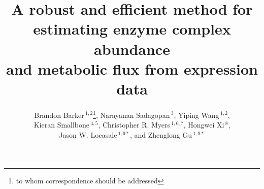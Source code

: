 \documentclass{bioinfo}
\newcommand*{\commonDir}{../common/}   %
\begin{document}

\renewcommand{\figurename}{\textbf{Fig.}}
\captionsetup{belowskip=0pt}









\title[FALCON]{A robust and efficient method for\\ 
estimating enzyme complex abundance\\ 
and metabolic flux from expression data}
  \author[Barker \textit{et~al.}]{Brandon Barker\,$^{1,2}$\footnote{to whom correspondence should be addressed},
    Narayanan Sadagopan\,$^{3}$, Yiping Wang\,$^{1,2}$, \\
    Kieran Smallbone\,$^{4,5}$, Christopher R. Myers\,$^{1,6,7}$, Hongwei Xi\,$^{8}$, \\ 
    Jason W. Locasale\,$^{1,9*}$, and Zhenglong Gu\,$^{1,9*}$\\
 }

\address{$^{1}$Tri-Institutional Training Program in Computational
  Biology and Medicine, 1300 York Avenue, Box 194, New York, NY, USA.
  $^{2}$Department of Biological Statistics and Computational Biology, 
    Cornell University, 1198 Comstock Hall, Ithaca, NY, USA.
  $^{3}$College of Engineering, Cornell University, Carpenter Hall, 
    Ithaca, NY, USA.
  $^{4}$ School of Computer Science, The University of Manchester, Manchester, UK.
  $^{5}$Manchester Center for Integrative Systems Biology, The University of Manchester, Manchester, UK.
  $^{6}$Laboratory of Atomic and Solid State Physics, Cornell University, Ithaca, NY, USA.
  $^{7}$Institute of Biotechnology, Cornell University, Ithaca, NY, USA.
  $^{8}$Department of Computer Science, Boston University,
    111 Cummington Street, Boston, MA, USA.
  $^{9}$Division of Nutritional Sciences, Cornell University, 
    Savage Hall, Ithaca, NY, USA.
  }
\end{document}
